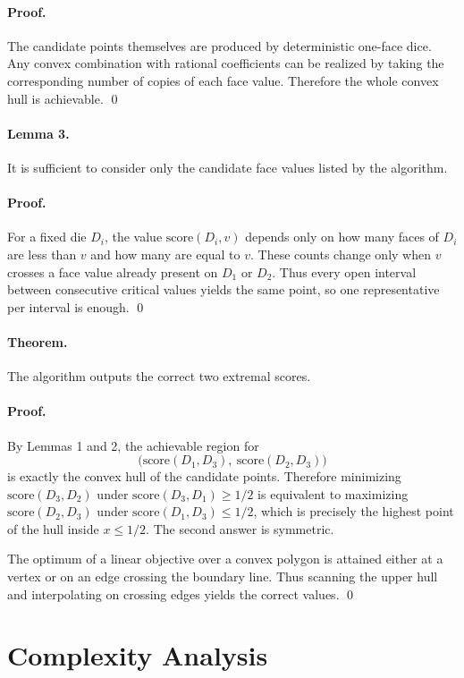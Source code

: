 \documentclass[11pt]{article}
\begin{document}
\paragraph{Proof.}
The candidate points themselves are produced by deterministic one-face dice. Any convex combination
with rational coefficients can be realized by taking the corresponding number of copies of each face
value. Therefore the whole convex hull is achievable. \qed

\paragraph{Lemma 3.}
It is sufficient to consider only the candidate face values listed by the algorithm.

\paragraph{Proof.}
For a fixed die $D_i$, the value $\text{score}(D_i,v)$ depends only on how many faces of $D_i$ are less
than $v$ and how many are equal to $v$. These counts change only when $v$ crosses a face value already
present on $D_1$ or $D_2$. Thus every open interval between consecutive critical values yields the same
point, so one representative per interval is enough. \qed

\paragraph{Theorem.}
The algorithm outputs the correct two extremal scores.

\paragraph{Proof.}
By Lemmas 1 and 2, the achievable region for
\[
\bigl(\text{score}(D_1,D_3),\ \text{score}(D_2,D_3)\bigr)
\]
is exactly the convex hull of the candidate points. Therefore minimizing $\text{score}(D_3,D_2)$ under
$\text{score}(D_3,D_1)\ge 1/2$ is equivalent to maximizing $\text{score}(D_2,D_3)$ under
$\text{score}(D_1,D_3)\le 1/2$, which is precisely the highest point of the hull inside $x \le 1/2$. The
second answer is symmetric.

The optimum of a linear objective over a convex polygon is attained either at a vertex or on an edge
crossing the boundary line. Thus scanning the upper hull and interpolating on crossing edges yields the
correct values. \qed

\section*{Complexity Analysis}
\end{document}
